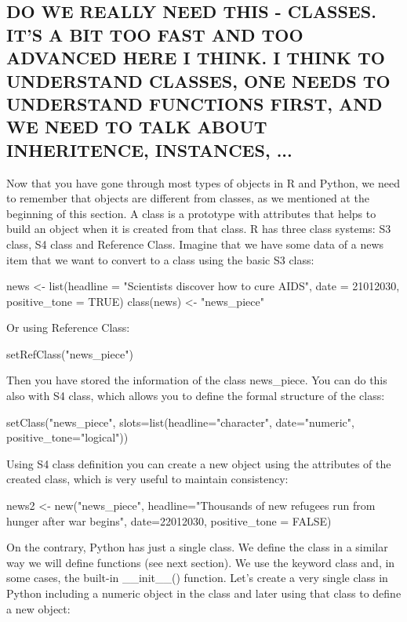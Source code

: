 



\subsection{DO WE REALLY NEED THIS - CLASSES. IT'S A BIT TOO FAST AND TOO ADVANCED HERE I THINK. I THINK TO UNDERSTAND CLASSES, ONE NEEDS TO UNDERSTAND FUNCTIONS FIRST, AND WE NEED TO TALK ABOUT INHERITENCE, INSTANCES, ...}

Now that you have gone through most types of objects in R and Python, we need to remember that objects are different from classes, as we mentioned at the beginning of this section. A class is a prototype with attributes that helps to build an object when it is created from that class. R has three class systems: S3 class, S4 class and Reference Class.  Imagine that we have some data of a news item that we want to convert to a class using the basic S3 class:

\begin{exampler}
news <- list(headline = "Scientists discover how to cure AIDS", date = 21012030, positive_tone = TRUE)
class(news) <- "news_piece"
\end{exampler}

Or using Reference Class:

\begin{exampler}
setRefClass("news_piece")
\end{exampler}

Then you have stored the information of the class news\_piece.  You can do this also with S4 class, which allows you to define the formal structure of the class:

\begin{exampler}
setClass("news_piece", slots=list(headline="character", date="numeric", positive_tone="logical"))
\end{exampler}

Using S4 class definition you can create a new object using the attributes of the created class, which is very useful to maintain consistency:

\begin{exampler}
news2 <- new("news_piece", headline="Thousands of new refugees run from hunger after war begins", date=22012030, positive_tone = FALSE)
\end{exampler}

On the contrary, Python has just a single class. We define the class in a similar way we will define functions (see next section). We use the keyword class and, in some cases, the built-in \_\_init\_\_() function.  Let's create a very single class in Python including a numeric object in the class and later using that class to define a new object:

